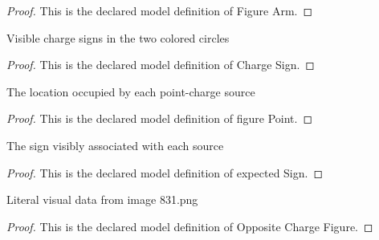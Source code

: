 \begin{proof}
  This is the declared model definition of Figure Arm.
\end{proof}
\begin{definition}
  \label{def:physics:phyx-mini-0831:phyxminiproblems-problemphyxmini0831-chargesign}
  Visible charge signs in the two colored circles
\end{definition}
\begin{proof}
  This is the declared model definition of Charge Sign.
\end{proof}
\begin{definition}
  \label{def:physics:phyx-mini-0831:phyxminiproblems-problemphyxmini0831-chargesource-figurepoint}
  The location occupied by each point-charge source
\end{definition}
\begin{proof}
  This is the declared model definition of figure Point.
\end{proof}
\begin{definition}
  \label{def:physics:phyx-mini-0831:phyxminiproblems-problemphyxmini0831-chargesource-expectedsign}
  The sign visibly associated with each source
\end{definition}
\begin{proof}
  This is the declared model definition of expected Sign.
\end{proof}
\begin{definition}
  \label{def:physics:phyx-mini-0831:phyxminiproblems-problemphyxmini0831-oppositechargefigure}
  Literal visual data from image 831.png
\end{definition}
\begin{proof}
  This is the declared model definition of Opposite Charge Figure.
\end{proof}
